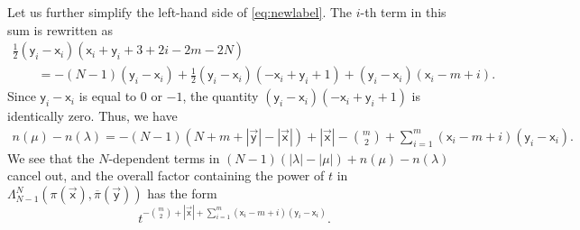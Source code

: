 \documentclass[11pt]{article}
\numberwithin{equation}{section}
\numberwithin{equation}{section}
\begin{document}
Let us further simplify the left-hand side of
\eqref{eq:newlabel}.
The $i$-th term in this sum
is rewritten as
\begin{gather*}
	\frac12(\mathsf{y}_i-\mathsf{x}_i)(\mathsf{x}_i+\mathsf{y}_i+3+2i-2m-2N)\\
\qquad{}
	=
	-(N-1)(\mathsf{y}_i-\mathsf{x}_i)
	+
	\frac12(\mathsf{y}_i-\mathsf{x}_i)(-\mathsf{x}_i+\mathsf{y}_i+1)
	+
	(\mathsf{y}_i-\mathsf{x}_i)(\mathsf{x}_i-m+i).
\end{gather*}
Since $\mathsf{y}_i-\mathsf{x}_i$ is equal to $0$ or $-1$,
the quantity
$(\mathsf{y}_i-\mathsf{x}_i)(-\mathsf{x}_i+\mathsf{y}_i+1)$
is identically zero.
Thus, we have
\begin{align*}
	n(\mu)-n(\lambda)=
	-(N-1)(N+m+|\vec{\mathsf{y}}|-|\vec{\mathsf{x}}|)
	+|\vec{\mathsf{x}}|-\binom m2
	+\sum_{i=1}^{m}
	(\mathsf{x}_{i}-m+i)(\mathsf{y}_{i}-\mathsf{x}_{i}).
\end{align*}
We see that
the $N$-dependent terms
in
$(N-1)(|\lambda|-|\mu|)+n(\mu)-n(\lambda)$
cancel out, and the overall
factor containing the
power of $t$
in
$\Lambda^{N}_{N-1}(\pi(\vec{\mathsf{x}}),\overline\pi(\vec{\mathsf{y}}))$
has the form
\begin{equation*}%
	t^{-\binom m2+|\vec{\mathsf{x}}|
	+\sum_{i=1}^{m}
	(\mathsf{x}_{i}-m+i)(\mathsf{y}_{i}-\mathsf{x}_{i})}.
\end{equation*}
\end{document}
